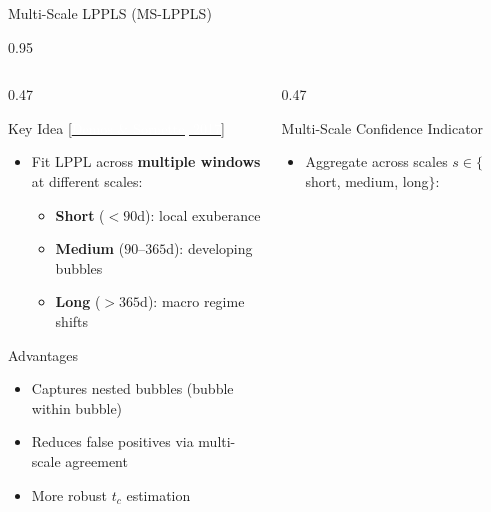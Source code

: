 \documentclass[9pt, aspectratio=169, t]{beamer}
\begin{document}
\begin{frame}{Multi-Scale LPPLS (MS-LPPLS)}
    \begin{cminipage}{0.95\textwidth}
    {\scriptsize
    \begin{columns}[T]
        \begin{column}{0.47\textwidth}
            \begin{block}{Key Idea {\scriptsize[\href{https://doi.org/10.1080/14697688.2016.1231417}{\textcolor{white}{Demos \& Sornette, 2017}}]}}
                \begin{itemize}\setlength{\itemsep}{0pt}
                    \item Fit LPPL across \textbf{multiple windows} at different scales:
                    \begin{itemize}\setlength{\itemsep}{0pt}
                        \item \textbf{Short} ($<90$d): local exuberance
                        \item \textbf{Medium} ($90$--$365$d): developing bubbles
                        \item \textbf{Long} ($>365$d): macro regime shifts
                    \end{itemize}
                \end{itemize}
            \end{block}
            \vspace{-2mm}
            \begin{exampleblock}{Advantages}
                \begin{itemize}\setlength{\itemsep}{0pt}
                    \item Captures nested bubbles (bubble within bubble)
                    \item Reduces false positives via multi-scale agreement
                    \item More robust $t_c$ estimation
                \end{itemize}
            \end{exampleblock}
        \end{column}
        \begin{column}{0.47\textwidth}
            \begin{alertblock}{Multi-Scale Confidence Indicator}
                \begin{itemize}\setlength{\itemsep}{0pt}
                    \item Aggregate across scales $s \in \{$short, medium, long$\}$:
                    \begin{itemize}\setlength{\itemsep}{0pt}

\end{itemize}
\end{itemize}
\end{alertblock}
\end{column}
\end{columns}}
\end{cminipage}
\end{frame}
\end{document}

